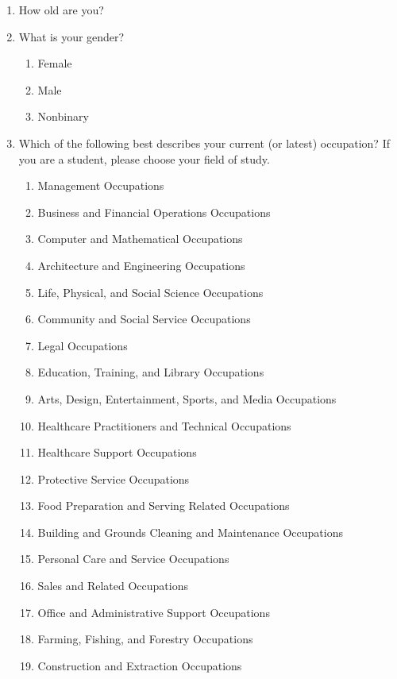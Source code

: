 \begin{enumerate}
    \item How old are you?
    \item What is your gender?
        \begin{enumerate}
            \item Female
            \item Male
            \item Nonbinary
        \end{enumerate}
    \item Which of the following best describes your current (or latest) occupation? If you are a student, please choose your field of study.
        \begin{enumerate}
            \item Management Occupations
            \item Business and Financial Operations Occupations
            \item Computer and Mathematical Occupations
            \item Architecture and Engineering Occupations
            \item Life, Physical, and Social Science Occupations
            \item Community and Social Service Occupations
            \item Legal Occupations
            \item Education, Training, and Library Occupations
            \item Arts, Design, Entertainment, Sports, and Media Occupations
            \item Healthcare Practitioners and Technical Occupations
            \item Healthcare Support Occupations
            \item Protective Service Occupations
            \item Food Preparation and Serving Related Occupations
            \item Building and Grounds Cleaning and Maintenance Occupations
            \item Personal Care and Service Occupations
            \item Sales and Related Occupations
            \item Office and Administrative Support Occupations
            \item Farming, Fishing, and Forestry Occupations
            \item Construction and Extraction Occupations

\end{enumerate}
\end{enumerate}
